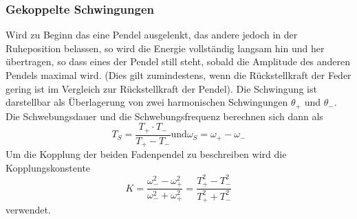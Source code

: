     \subsubsection{Gekoppelte Schwingungen}
        Wird zu Beginn das eine Pendel ausgelenkt, das andere jedoch in der Ruheposition 
        belassen, so wird die Energie vollständig langsam hin und her übertragen, so dass 
        eines der Pendel still steht, sobald die Amplitude des anderen Pendels maximal wird.
        (Dies gilt zumindestens, wenn die Rückstellkraft der Feder gering ist im Vergleich 
        zur Rückstellkraft der Pendel). Die Schwingung ist darstellbar als Überlagerung von 
        zwei harmonischen Schwingungen $\theta_+$ und $\theta_-$. Die Schwebungsdauer und 
        die Schwebungsfrequenz berechnen sich dann als 
        \begin{equation}
            T_S = \dfrac{T_+\cdot T_-}{T_+ - T_-} \text{und} \omega_S=\omega_+ - \omega_-
        \end{equation}
        Um die Kopplung der beiden Fadenpendel zu beschreiben wird die Kopplungskonstente
        \begin{equation}
            K=\dfrac{\omega_-^2 - \omega_+^2}{\omega_-^2 + \omega_+^2}=
            \dfrac{T_+^2 - T_-^2}{T_+^2 + T_-^2}
        \end{equation}
        verwendet.